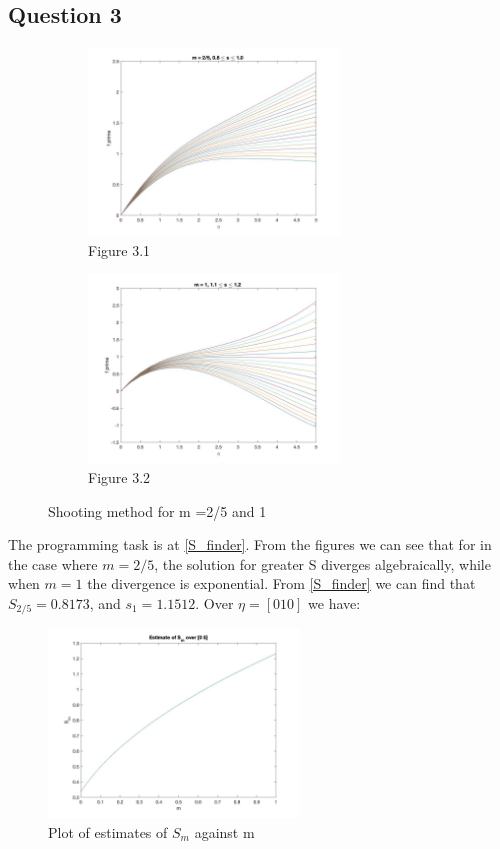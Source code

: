 \documentclass[a4paper,11pt]{article}
\begin{document}
\subsection{Question 3}
\begin{figure}[H]
\begin{subfigure}{0.5\textwidth}
\includegraphics[width = \linewidth, height = 5cm]{Q3(1).jpg}
\caption{Figure 3.1}
\label{Q3(1)}
\end{subfigure}
\begin{subfigure}{0.5\textwidth}
\includegraphics[width = \linewidth, height = 5cm]{Q3(2).jpg}
\caption{Figure 3.2}
\label{Q3(2)}
\end{subfigure}
\caption{Shooting method for m =2/5 and 1}
\label{Q3}
\end{figure}
The programming task is at \ref{S_finder}. From the figures we can see that for in the case where $m = 2/5$, the solution for greater S diverges algebraically, while when $m = 1$ the divergence is exponential. From \ref{S_finder} we can find that $S_{2/5} = 0.8173$, and $s_{1} = 1.1512$. Over $\eta = [0 10]$ we have:
\begin{figure}[H]
\centering
\includegraphics[width= .5\linewidth, height = 5cm]{Q3(3).jpg}
\caption{Plot of estimates of $S_{m}$ against m}
\label{Est.}
\end{figure}
\end{document}
